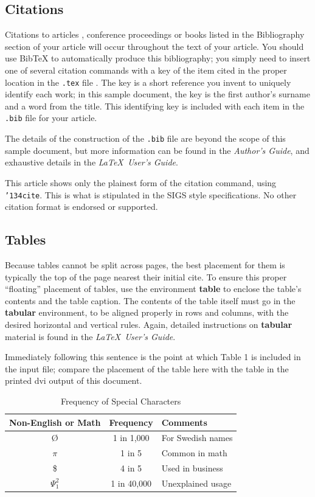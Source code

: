 \documentclass[acmtog, authorversion]{acmart}
\begin{document}
\subsection{Citations}
Citations to articles \cite{bowman:reasoning, clark:pct,
braams:babel, herlihy:methodology}, conference proceedings
\cite{clark:pct} or books \cite{salas:calculus, Lamport:LaTeX}
listed in the Bibliography section of your article will occur
throughout the text of your article. You should use BibTeX to
automatically produce this bibliography; you simply need to insert
one of several citation commands with a key of the item cited in
the proper location in the \texttt{.tex} file
\cite{Lamport:LaTeX}. The key is a short reference you invent to
uniquely identify each work; in this sample document, the key is
the first author's surname and a word from the title.  This
identifying key is included with each item in the \texttt{.bib}
file for your article.

The details of the construction of the \texttt{.bib} file are
beyond the scope of this sample document, but more information can
be found in the \textit{Author's Guide}, and exhaustive details in
the \textit{\LaTeX\ User's Guide}\cite{Lamport:LaTeX}.

This article shows only the plainest form of the citation command,
using \texttt{{\char'134}cite}. This is what is stipulated in the
SIGS style specifications. No other citation format is endorsed or
supported.

\subsection{Tables}
Because tables cannot be split across pages, the best placement
for them is typically the top of the page nearest their initial
cite.  To ensure this proper ``floating'' placement of tables, use
the environment \textbf{table} to enclose the table's contents and
the table caption.  The contents of the table itself must go in
the \textbf{tabular} environment, to be aligned properly in rows
and columns, with the desired horizontal and vertical rules.
Again, detailed instructions on \textbf{tabular} material is found
in the \textit{\LaTeX\ User's Guide}.

Immediately following this sentence is the point at which Table 1
is included in the input file; compare the placement of the table
here with the table in the printed dvi output of this document.

\begin{table}
\centering \caption{Frequency of Special Characters}
\begin{tabular}{|c|c|l|} \hline
Non-English or Math&Frequency&Comments\\ \hline \O & 1 in 1,000&
For Swedish names\\ \hline $\pi$ & 1 in 5& Common in math\\ \hline
\$ & 4 in 5 & Used in business\\ \hline
$\Psi^2_1$ & 1 in 40,000& Unexplained usage\\
\hline\end{tabular}
\end{table}
\end{document}
